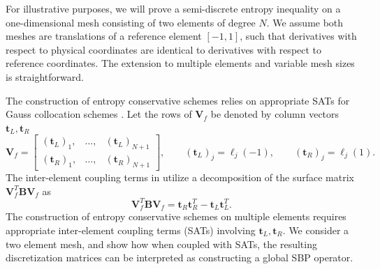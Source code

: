 \documentclass[onefignum,onetabnum,final]{siamart171218}
\newcommand{\LRp}[1]{\left( #1 \right)}
\newcommand*{\horzbar}{\rule[.5ex]{2.5ex}{0.5pt}}
\begin{document}
For illustrative purposes, we will prove a semi-discrete entropy inequality on a one-dimensional mesh consisting of two elements of degree $N$.  We assume both meshes are translations of a reference element  $[-1,1]$, such that derivatives with respect to physical coordinates are identical to derivatives with respect to reference coordinates.  The extension to multiple elements and variable mesh sizes is straightforward.  

The construction of entropy conservative schemes relies on appropriate SATs for Gauss collocation schemes \cite{fernandez2014review, crean2017high, fernandez2018simultaneous}.  Let the rows of $\bm{V}_f$ be denoted by column vectors $\bm{t}_L, \bm{t}_R$ 
\[
\bm{V}_f = \begin{bmatrix}
\LRp{\bm{t}_L}_1, & \ldots, & \LRp{\bm{t}_L}_{N+1}\\
\LRp{\bm{t}_R}_1, & \ldots, & \LRp{\bm{t}_R}_{N+1}
\end{bmatrix}, \qquad \LRp{\bm{t}_L}_j = \ell_j(-1), \qquad \LRp{\bm{t}_R}_j = \ell_j(1).
\]
The inter-element coupling terms in \cite{fernandez2014review, crean2017high, fernandez2018simultaneous} utilize a decomposition of the surface matrix $\bm{V}_f^T\bm{B}\bm{V}_f$ as  
\begin{equation}
\bm{V}_f^T\bm{B}\bm{V}_f 
= \bm{t}_R\bm{t}_R^T - \bm{t}_L\bm{t}_L^T.
\label{eq:bmatdecomp}
\end{equation}
The construction of entropy conservative schemes on multiple elements requires appropriate inter-element coupling terms (SATs) involving $\bm{t}_L, \bm{t}_R$.  We consider a two element mesh, and show how when coupled with SATs, the resulting discretization matrices can be interpreted as constructing a global SBP operator.  
\end{document}
